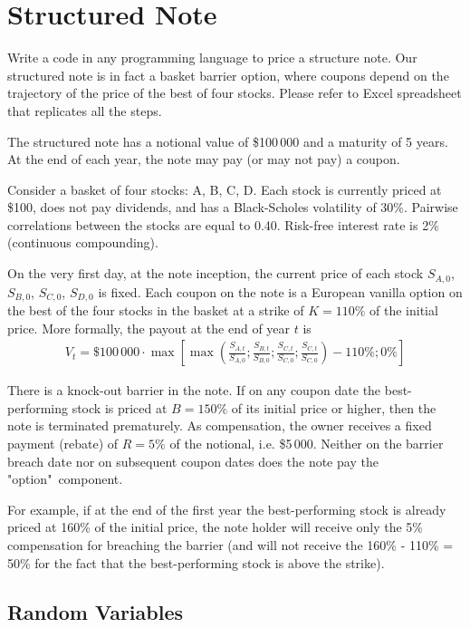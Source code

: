\documentclass[a4paper,14pt]{extarticle}
\begin{document}
\section{Structured Note}

Write a code in any programming language to price a structure note. Our structured note is in fact a basket barrier option, where coupons depend on the trajectory of the price of the best of four stocks. Please refer to Excel spreadsheet that replicates all the steps.

The structured note has a notional value of \$100\,000 and a maturity of 5 years. At the end of each year, the note may pay (or may not pay) a coupon.

Consider a basket of four stocks: A, B, C, D. Each stock is currently priced at \$100, does not pay dividends, and has a Black-Scholes volatility of 30\%. Pairwise correlations between the stocks are equal to 0.40. Risk-free interest rate is 2\% (continuous compounding).

On the very first day, at the note inception, the current price of each stock $S_{A,0}$, $S_{B,0}$, $S_{C,0}$, $S_{D,0}$ is fixed. Each coupon on the note is a European vanilla option on the best of the four stocks in the basket at a strike of $K=110\%$ of the initial price. More formally, the payout at the end of year $t$ is
\begin{align*}
V_t = \$100\,000 \cdot \max\left[\max\left(\frac{S_{A,t}}{S_{A,0}}; \frac{S_{B,t}}{S_{B,0}}; \frac{S_{C,t}}{S_{C,0}}; \frac{S_{C,t}}{S_{C,0}}\right) - 110\%; 0\% \right]
\end{align*}

There is a knock-out barrier in the note. If on any coupon date the best-performing stock is priced at $B=150\%$ of its initial price or higher, then the note is terminated prematurely. As compensation, the owner receives a fixed payment (rebate) of $R=5\%$ of the notional, i.e. \$5\,000. Neither on the barrier breach date nor on subsequent coupon dates does the note pay the "option"\ component.

For example, if at the end of the first year the best-performing stock is already priced at 160\% of the initial price, the note holder will receive only the 5\% compensation for breaching the barrier (and will not receive the 160\% - 110\% = 50\% for the fact that the best-performing stock is above the strike).

\subsection{Random Variables}
\end{document}
